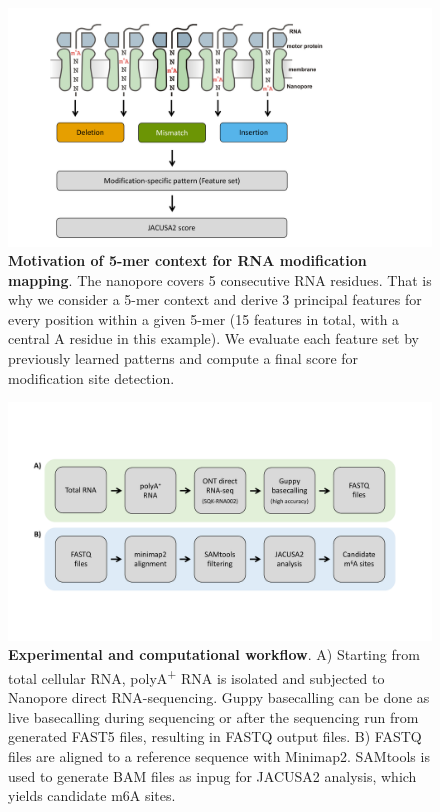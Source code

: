 \documentclass[times, 11pt, a4paper]{article}
\begin{document}
\begin{figure}[h!]
    \includegraphics[width = 1\textwidth]{Figure2.pdf}
  \caption{\textbf{Motivation of 5-mer context for RNA modification mapping}. The nanopore covers 5 consecutive RNA residues. That is why we consider a 5-mer context and derive 3 principal features for every position within a given 5-mer (15 features in total, with a central A residue in this example). We evaluate each feature set by previously learned patterns and compute a final score for modification site detection.}
  \label{fig:5mer}
      \end{figure}
\newpage

\begin{figure}[h!]
    \includegraphics[width = 1\textwidth]{Figure3.pdf}
  \caption{\textbf{Experimental and computational workflow}. A) Starting from total cellular RNA, polyA\textsuperscript{+} RNA is isolated and subjected to Nanopore direct RNA-sequencing. Guppy basecalling can be done as live basecalling during sequencing or after the sequencing run from generated FAST5 files, resulting in FASTQ output files. B) FASTQ files are aligned to a reference sequence with Minimap2. SAMtools is used to generate BAM files as inpug for JACUSA2 analysis, which yields candidate m6A sites.}
  \label{fig:workflow}
      \end{figure}
\newpage
\end{document}
